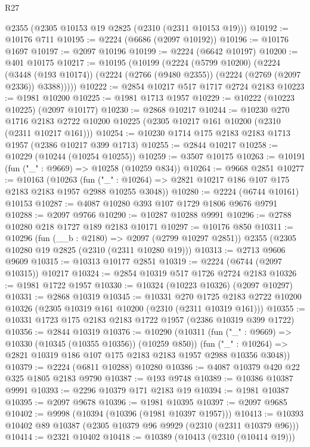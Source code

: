 \begin{lexlean}{R27}
\begin{coremodule}
    @2355
    (@2305 @10153 @19 @2825 (@2310 (@2311 @10153 @19)))
@10192 := @10176 @711
@10195 := @2224 (@6686 (@2097 @10192))
@10196 := @10176 @1697
@10197 := @2097 @10196
@10199 := @2224 (@6642 @10197)
@10200 := @401 @10175
@10217 := @10195
    (@10199
      (@2224
        (@5799 @10200)
        (@2224
          (@3448 (@193 @10174))
          (@2224 (@2766 (@9480 @2355)) (@2224 (@2769 (@2097 @2336)) @3388)))))
@10222 := @2854 @10217 @517 @1717 @2724 @2183
@10223 := @1981 @10200
@10225 := @1981 @1713 @1957
@10229 := @10222 (@10223 @10225) (@2097 @10177)
@10230 := @2868 @10217
@10244 := @10230
    @270
    @1716
    @2183
    @2722
    @10200
    @10225
    (@2305 @10217 @161 @10200 (@2310 (@2311 @10217 @161)))
@10254 := @10230 @1714 @175 @2183 @2183 @1713 @1957 (@2386 @10217 @399 @1713)
@10255 := @2844 @10217
@10258 := @10229 (@10244 (@10254 @10255))
@10259 := @3507 @10175
@10263 := @10191 (fun ("_" : @9669) => @10258 (@10259 @834))
@10264 := @9668 @2851
@10277 := @10163
    (@10263
      (fun ("_" : @10264) => @2821 @10217 @186 @107 @175 @2183 @2183 @1957 @2988 @10255 @3048))
@10280 := @2224 (@6744 @10161) @10153
@10287 := @4087 @10280 @393 @107 @1729 @1806 @9676 @9791
@10288 := @2097 @9766
@10290 := @10287 @10288 @9991
@10296 := @2788 @10280 @218 @1727 @189 @2183 @10171
@10297 := @10176 @850
@10311 := @10296
    (fun (__b : @2180) => @2097 (@2799 @10297 @2851))
    @2355
    (@2305 @10280 @19 @2825 (@2310 (@2311 @10280 @19)))
@10313 := @2713 @9606 @9609
@10315 := @10313 @10177 @2851
@10319 := @2224 (@6744 (@2097 @10315)) @10217
@10324 := @2854 @10319 @517 @1726 @2724 @2183
@10326 := @1981 @1722 @1957
@10330 := @10324 (@10223 @10326) (@2097 @10297)
@10331 := @2868 @10319
@10345 := @10331
    @270
    @1725
    @2183
    @2722
    @10200
    @10326
    (@2305 @10319 @161 @10200 (@2310 (@2311 @10319 @161)))
@10355 := @10331 @1723 @175 @2183 @2183 @1722 @1957 (@2386 @10319 @399 @1722)
@10356 := @2844 @10319
@10376 := @10290
    (@10311
      (fun ("_" : @9669) => @10330 (@10345 (@10355 @10356)) (@10259 @850))
      (fun ("_" : @10264) => @2821 @10319 @186 @107 @175 @2183 @2183 @1957 @2988 @10356 @3048))
@10379 := @2224 (@6811 @10288) @10280
@10386 := @4087 @10379 @420 @22 @325 @1805 @2183 @9790
@10387 := @193 @9748
@10389 := @10386 @10387 @9991
@10393 := @2296 @10379 @171 @2183 @19
@10394 := @1981 @10387
@10395 := @2097 @9678
@10396 := @1981 @10395
@10397 := @2097 @9685
@10402 := @9998 (@10394 (@10396 (@1981 @10397 @1957)))
@10413 := @10393 @10402 @89 @10387 (@2305 @10379 @96 @9929 (@2310 (@2311 @10379 @96)))
@10414 := @2321 @10402
@10418 := @10389 (@10413 (@2310 (@10414 @19)))

\end{coremodule}
\end{lexlean}
